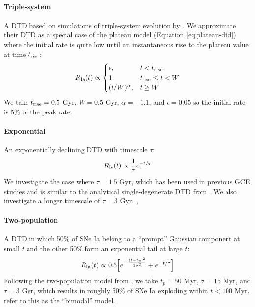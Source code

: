 \documentclass[modern,linenumbers]{aastex631}
\begin{document}
\paragraph{Triple-system} A DTD based on simulations of triple-system evolution by \citet{Rajamuthukumar2022-TripleEvolution}. We approximate their DTD as a special case of the plateau model (Equation \ref{eq:plateau-dtd}) where the initial rate is quite low until an instantaneous rise to the plateau value at time $t_{\rm rise}$:
\begin{equation}
    R_{\rm Ia}(t) \propto
    \begin{cases}
        \epsilon, & t < t_{\rm rise} \\
        1, & t_{\rm rise} \leq t < W \\
        (t / W) ^ \alpha, & t \geq W
    \end{cases}
    \label{eq:triple-dtd}
\end{equation}
We take $t_{\rm rise}=0.5$ Gyr, $W=0.5$ Gyr, $\alpha=-1.1$, and $\epsilon=0.05$ so the initial rate is 5\% of the peak rate.

\paragraph{Exponential} An exponentially declining DTD with timescale $\tau$:
\begin{equation}
    R_{\rm Ia}(t) \propto \frac{1}{\tau} e^{-t/\tau}
    \label{eq:exponential-dtd}
\end{equation}
We investigate the case where $\tau=1.5$ Gyr, which has been used in previous GCE studies \citep[e.g.,][]{Schonrich2009-RadialMixing,Weinberg2017-ChemicalEquilibrium} and is similar to the analytical single-degenerate DTD from \citet{Greggio2005-AnalyticalRates}. We also investigate a longer timescale of $\tau=3$ Gyr. \citet{Matteucci1986-SupernovaEnrichment}, \citet{Stolger2020-ExponentialDTD}

\paragraph{Two-population} A DTD in which 50\% of SNe Ia belong to a ``prompt'' Gaussian component at small $t$ and the other 50\% form an exponential tail at large $t$:
\begin{equation}
    R_{\rm Ia}(t) \propto 0.5\Big[e^{-\frac{(t-t_p)^2}{2\sigma^2}} + e^{-t/\tau}\Big]
    \label{eq:prompt-dtd}
\end{equation}
Following the two-population model from \citet{Mannucci2006-TwoPopulations}, we take $t_p=50$ Myr, $\sigma=15$ Myr, and $\tau=3$ Gyr, which results in roughly 50\% of SNe Ia exploding within $t<100$ Myr. \citet{Poulhazan2018-PrecisionPollution} refer to this as the ``bimodal'' model.
\end{document}
